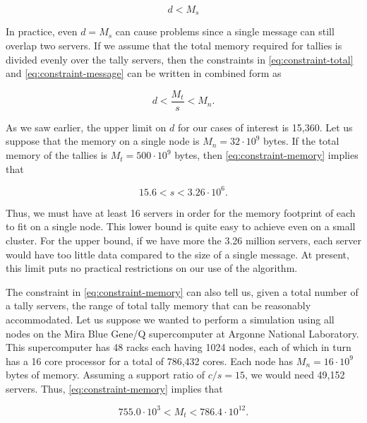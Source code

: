 \begin{equation}
  \label{eq:constraint-message}
  d < M_s
\end{equation}

\noindent In practice, even $d = M_s$ can cause problems since a single message
can still overlap two servers. If we assume that the total memory required for
tallies is divided evenly over the tally servers, then the constraints in
\eqref{eq:constraint-total} and \eqref{eq:constraint-message} can be written in
combined form as

\begin{equation}
  \label{eq:constraint-memory}
  d < \frac{M_t}{s} < M_n.
\end{equation}

\noindent As we saw earlier, the upper limit on $d$ for our cases of interest is
15,360. Let us suppose that the memory on a single node is $M_n = 32 \cdot 10^9$
bytes. If the total memory of the tallies is $M_t = 500 \cdot 10^9$ bytes, then
\eqref{eq:constraint-memory} implies that

\begin{equation}
  \label{eq:constraint-example}
  15.6 < s < 3.26\cdot 10^6.
\end{equation}

\noindent Thus, we must have at least 16 servers in order for the memory
footprint of each to fit on a single node. This lower bound is quite easy to
achieve even on a small cluster. For the upper bound, if we have more the 3.26
million servers, each server would have too little data compared to the size of
a single message. At present, this limit puts no practical restrictions on our
use of the algorithm.

The constraint in \eqref{eq:constraint-memory} can also tell us, given a total
number of a tally servers, the range of total tally memory that can be
reasonably accommodated. Let us suppose we wanted to perform a simulation using
all nodes on the Mira Blue Gene/Q supercomputer at Argonne National
Laboratory. This supercomputer has 48 racks each having 1024 nodes, each of
which in turn has a 16 core processor for a total of 786,432 cores. Each node
has $M_n = 16 \cdot 10^9$ bytes of memory. Assuming a support ratio of $c/s =
15$, we would need 49,152 servers. Thus, \eqref{eq:constraint-memory} implies
that

\begin{equation}
  \label{eq:constraint-mira}
  755.0 \cdot 10^3 < M_t < 786.4 \cdot 10^{12}.
\end{equation}

